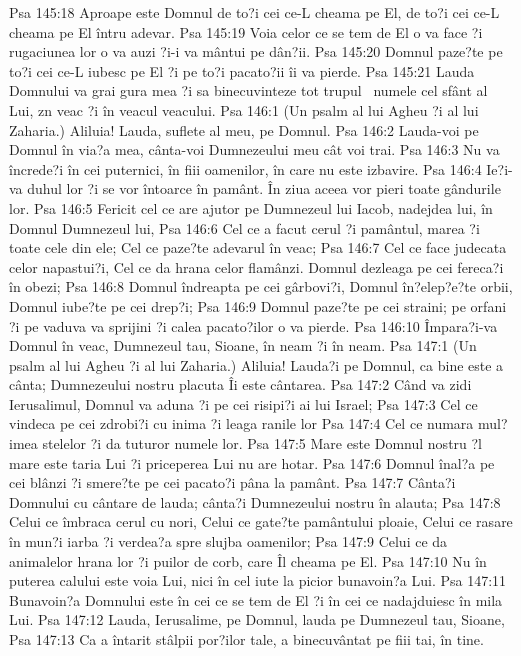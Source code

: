 Psa 145:18  Aproape este Domnul de to?i cei ce-L cheama pe El, de to?i cei ce-L cheama pe El întru adevar.
Psa 145:19  Voia celor ce se tem de El o va face ?i rugaciunea lor o va auzi ?i-i va mântui pe dân?ii.
Psa 145:20  Domnul paze?te pe to?i cei ce-L iubesc pe El ?i pe to?i pacato?ii îi va pierde.
Psa 145:21  Lauda Domnului va grai gura mea ?i sa binecuvinteze tot trupul  numele cel sfânt al Lui, zn veac ?i în veacul veacului.
Psa 146:1  (Un psalm al lui Agheu ?i al lui Zaharia.) Aliluia! Lauda, suflete al meu, pe Domnul.
Psa 146:2  Lauda-voi pe Domnul în via?a mea, cânta-voi Dumnezeului meu cât voi trai.
Psa 146:3  Nu va încrede?i în cei puternici, în fiii oamenilor, în care nu este izbavire.
Psa 146:4  Ie?i-va duhul lor ?i se vor întoarce în pamânt. În ziua aceea vor pieri toate gândurile lor.
Psa 146:5  Fericit cel ce are ajutor pe Dumnezeul lui Iacob, nadejdea lui, în Domnul Dumnezeul lui,
Psa 146:6  Cel ce a facut cerul ?i pamântul, marea ?i toate cele din ele; Cel ce paze?te adevarul în veac;
Psa 146:7  Cel ce face judecata celor napastui?i, Cel ce da hrana celor flamânzi. Domnul dezleaga pe cei fereca?i în obezi;
Psa 146:8  Domnul îndreapta pe cei gârbovi?i, Domnul în?elep?e?te orbii, Domnul iube?te pe cei drep?i;
Psa 146:9  Domnul paze?te pe cei straini; pe orfani ?i pe vaduva va sprijini ?i calea pacato?ilor o va pierde.
Psa 146:10  Împara?i-va Domnul în veac, Dumnezeul tau, Sioane, în neam ?i în neam.
Psa 147:1  (Un psalm al lui Agheu ?i al lui Zaharia.) Aliluia! Lauda?i pe Domnul, ca bine este a cânta; Dumnezeului nostru placuta Îi este cântarea.
Psa 147:2  Când va zidi Ierusalimul, Domnul va aduna ?i pe cei risipi?i ai lui Israel;
Psa 147:3  Cel ce vindeca pe cei zdrobi?i cu inima ?i leaga ranile lor
Psa 147:4  Cel ce numara mul?imea stelelor ?i da tuturor numele lor.
Psa 147:5  Mare este Domnul nostru ?l mare este taria Lui ?i priceperea Lui nu are hotar.
Psa 147:6  Domnul înal?a pe cei blânzi ?i smere?te pe cei pacato?i pâna la pamânt.
Psa 147:7  Cânta?i Domnului cu cântare de lauda; cânta?i Dumnezeului nostru în alauta;
Psa 147:8  Celui ce îmbraca cerul cu nori, Celui ce gate?te pamântului ploaie, Celui ce rasare în mun?i iarba ?i verdea?a spre slujba oamenilor;
Psa 147:9  Celui ce da animalelor hrana lor ?i puilor de corb, care Îl cheama pe El.
Psa 147:10  Nu în puterea calului este voia Lui, nici în cel iute la picior bunavoin?a Lui.
Psa 147:11  Bunavoin?a Domnului este în cei ce se tem de El ?i în cei ce nadajduiesc în mila Lui.
Psa 147:12  Lauda, Ierusalime, pe Domnul, lauda pe Dumnezeul tau, Sioane,
Psa 147:13  Ca a întarit stâlpii por?ilor tale, a binecuvântat pe fiii tai, în tine.
